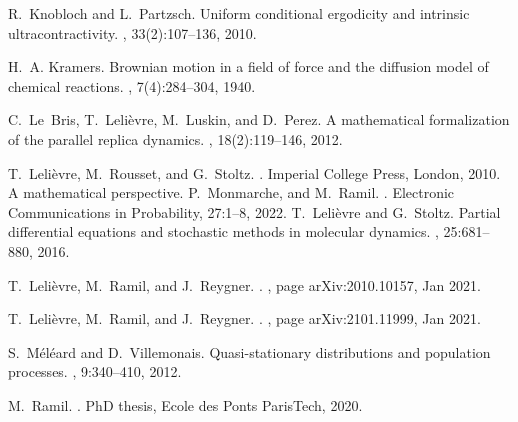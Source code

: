 \documentclass[preprint,EJP]{ejpecp}
\begin{document}
\begin{thebibliography}{10}
R.~Knobloch and L.~Partzsch.
\newblock Uniform conditional ergodicity and intrinsic ultracontractivity.
, 33(2):107--136, 2010.

H.~A. Kramers.
\newblock Brownian motion in a field of force and the diffusion model of
  chemical reactions.
, 7(4):284--304, 1940.

C.~Le~Bris, T.~Leli\`evre, M.~Luskin, and D.~Perez.
\newblock A mathematical formalization of the parallel replica dynamics.
, 18(2):119--146, 2012.

T.~Leli\`evre, M.~Rousset, and G.~Stoltz.
.
\newblock Imperial College Press, London, 2010.
\newblock A mathematical perspective.
P.~Monmarche, and M.~Ramil. 
.
\newblock Electronic Communications in Probability, 27:1--8, 2022. 
T.~Leli\`evre and G.~Stoltz.
\newblock Partial differential equations and stochastic methods in molecular
  dynamics.
, 25:681--880, 2016.

T.~Lelièvre, M.~Ramil, and J.~Reygner.
.
, page arXiv:2010.10157, Jan 2021.

T.~Lelièvre, M.~Ramil, and J.~Reygner.
.
, page arXiv:2101.11999, Jan 2021.

S.~M\'{e}l\'{e}ard and D.~Villemonais.
\newblock Quasi-stationary distributions and population processes.
, 9:340--410, 2012.

M.~Ramil.
.
\newblock PhD thesis, Ecole des Ponts ParisTech, 2020.

\end{thebibliography}
 

\end{document}
